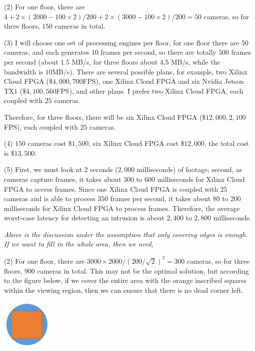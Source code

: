 \documentclass[11pt]{article}
\begin{document}
\begin{solution}
\item (2) For one floor, there are $4 + 2 \times (2000 - 100 \times 2) / 200 + 2 \times (3000 - 100 \times 2) / 200 = 50$ cameras, so for three floors, $150$ cameras in total.
\item (3) I will choose one set of processing engines per floor, for one floor there are $50$ cameras, and each generates $10$ frames per second, so there are totally $500$ frames per second (about $1.5$ MB/s, for three floors about $4.5$ MB/s, while the bandwidth is $10$MB/s). There are several possible plans, for example, two Xilinx Cloud FPGA  (\$$4,000, 700$FPS), one Xilinx Cloud FPGA and six Nvidia Jetson TX$1$ (\$$4,100, 560$FPS), and other plans. I prefer two Xilinx Cloud FPGA, each coupled with $25$ cameras.
\item Therefore, for three floors, there will be six Xilinx Cloud FPGA (\$$12,000, 2,100$FPS), each coupled with $25$ cameras.
\item (4) $150$ cameras cost \$$1,500$, six Xilinx Cloud FPGA cost \$$12,000$, the total cost is \$$13,500$.
\item (5) First, we must look at $2$ seconds ($2,000$ milliseconds) of footage; second, as cameras capture frames, it takes about $300$ to $600$ milliseconds for Xilinx Cloud FPGA to access frames. Since one Xilinx Cloud FPGA is coupled with $25$ cameras and is able to process $350$ frames per second, it takes about $80$ to $200$ milliseconds for Xilinx Cloud FPGA to process frames. Therefore, the average worst-case latency for detecting an intrusion is about $2,400$ to $2,800$ milliseconds.
\item \textit{Above is the discussion under the assumption that only covering edges is enough. If we want to fill in the whole area, then we need,}
\item (2) For one floor, there are $3000 \times 2000 / (200 / \sqrt{2})^2 = 300$ cameras, so for three floors, $900$ cameras in total. This may not be the optimal solution, but according to the figure below, if we cover the entire area with the orange inscribed squares within the viewing region, then we can ensure that there is no dead corner left.
\begin{center}
\includegraphics[width=2.5cm]{8.png}
\end{center}

\end{solution}
\end{document}
